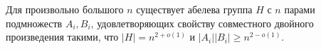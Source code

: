 \begin{conj}\label{conj:05:4.7}
  Для произвольно большого $n$ существует абелева группа $H$ с $n$ парами подмножеств $A_i, B_i$, удовлетворяющих свойству совместного двойного произведения такими, что $|H|=n^{2+o(1)}$ и $|A_i||B_i| \geq n^{2-o(1)}$.
\end{conj}



















































